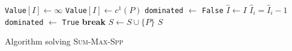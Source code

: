\documentclass[11pt,a4paper,parskip=half-]{scrartcl}
\begin{document}
\begin{solution}
\begin{algorithm}[H]
\begin{algorithmic}[1]
			\State \texttt{Value}$[I] \gets \infty$
		\Else
			\State \texttt{Value}$[I] \gets c^1(P)$
			\State \texttt{dominated} $\gets $ \texttt{False}
				\State $\hat I \gets I$
				\State $\hat I_i = \hat I_i - 1$
				\label{line:dominatetest}
					\State \texttt{dominated} $\gets $ \texttt{True}
					\State\textbf{break}
				\EndIf
					\State $S \gets S \cup \{P\}$ \label{line:solutionincrease}
				\EndIf
			\EndFor
		\EndIf
	\EndFor
	\State	\Return $S$
	\end{algorithmic}
	\caption{Algorithm solving \textsc{Sum-Max-Spp}}\label{alg:summaxspp}
	\end{algorithm}
\end{solution}

\takehome
\end{document}
